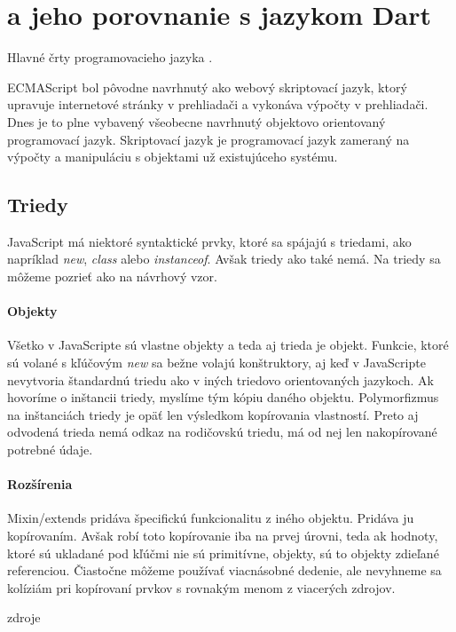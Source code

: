 \section{\JS{} a jeho porovnanie s jazykom Dart}
Hlavné črty programovacieho jazyka \JS{}. 

ECMAScript bol pôvodne navrhnutý ako webový skriptovací jazyk, ktorý upravuje internetové stránky v prehliadači a vykonáva výpočty v prehliadači. Dnes je to plne vybavený všeobecne navrhnutý objektovo orientovaný programovací jazyk.
Skriptovací jazyk je programovací jazyk zameraný na výpočty a manipuláciu s objektami už existujúceho systému.
\TODO

\subsection{Triedy}
JavaScript má niektoré syntaktické prvky, ktoré sa spájajú s triedami, ako napríklad \emph{new}, \emph{class} alebo \emph{instanceof}. Avšak triedy ako také nemá. Na triedy sa môžeme pozrieť ako na návrhový vzor. 

\paragraph{Objekty}
Všetko v JavaScripte sú vlastne objekty a teda aj trieda je objekt. Funkcie, ktoré sú volané s kľúčovým \emph{new} sa bežne volajú konštruktory, aj keď v JavaScripte nevytvoria štandardnú triedu ako v iných triedovo orientovaných jazykoch. Ak hovoríme o inštancii triedy, myslíme tým kópiu daného objektu. Polymorfizmus na inštanciách triedy je opäť len výsledkom kopírovania vlastností. Preto aj odvodená trieda nemá odkaz na rodičovskú triedu, má od nej len nakopírované potrebné údaje.

\paragraph{Rozšírenia}
Mixin/extends pridáva špecifickú funkcionalitu z iného objektu. Pridáva ju kopírovaním. Avšak robí toto kopírovanie iba na prvej úrovni, teda ak hodnoty, ktoré sú ukladané pod kľúčmi nie sú primitívne, objekty, sú to objekty zdieľané referenciou. Čiastočne môžeme používať viacnásobné dedenie, ale nevyhneme sa kolíziám pri kopírovaní prvkov s rovnakým menom z viacerých zdrojov.

\TODO zdroje


